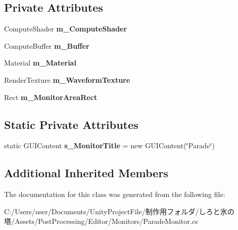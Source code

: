\subsection*{Private Attributes}
\begin{DoxyCompactItemize}
\item 
\mbox{\label{class_unity_editor_1_1_post_processing_1_1_parade_monitor_a06d42ea3147de5f7337fadc2a40c7d5d}} 
Compute\+Shader {\bfseries m\+\_\+\+Compute\+Shader}
\item 
\mbox{\label{class_unity_editor_1_1_post_processing_1_1_parade_monitor_a12da0f3ede09786fb572dae472904844}} 
Compute\+Buffer {\bfseries m\+\_\+\+Buffer}
\item 
\mbox{\label{class_unity_editor_1_1_post_processing_1_1_parade_monitor_a50924ea080a398e56ad1e6500b1c8eb6}} 
Material {\bfseries m\+\_\+\+Material}
\item 
\mbox{\label{class_unity_editor_1_1_post_processing_1_1_parade_monitor_a4c6c1ac0bc9e7dc63deccb8bb832ad74}} 
Render\+Texture {\bfseries m\+\_\+\+Waveform\+Texture}
\item 
\mbox{\label{class_unity_editor_1_1_post_processing_1_1_parade_monitor_a2844277789f86e376b1213ac34154590}} 
Rect {\bfseries m\+\_\+\+Monitor\+Area\+Rect}
\end{DoxyCompactItemize}
\subsection*{Static Private Attributes}
\begin{DoxyCompactItemize}
\item 
\mbox{\label{class_unity_editor_1_1_post_processing_1_1_parade_monitor_a099dcbf41e23ffee0c1221da71f931ab}} 
static G\+U\+I\+Content {\bfseries s\+\_\+\+Monitor\+Title} = new G\+U\+I\+Content(\char`\"{}Parade\char`\"{})
\end{DoxyCompactItemize}
\subsection*{Additional Inherited Members}


The documentation for this class was generated from the following file\+:\begin{DoxyCompactItemize}
\item 
C\+:/\+Users/user/\+Documents/\+Unity\+Project\+File/制作用フォルダ/しろと氷の塔/\+Assets/\+Post\+Processing/\+Editor/\+Monitors/Parade\+Monitor.\+cs\end{DoxyCompactItemize}
